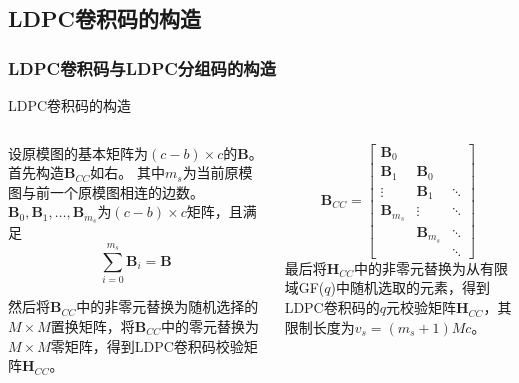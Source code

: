 \documentclass{beamer}
\begin{document}
\subsection{LDPC卷积码的构造}
\begin{frame}
	\frametitle{LDPC卷积码与LDPC分组码的构造}
		\begin{block}{LDPC卷积码的构造}
		\begin{columns}
		\begin{column}{0.5\textwidth}
		\footnotesize
设原模图的基本矩阵为$(c-b)\times c$的$\mathbf{B}$。
首先构造$\mathbf{B}_{CC}$如右。
其中$m_s$为当前原模图与前一个原模图相连的边数。$\mathbf{B}_0 , \mathbf{B}_1 , \dots , \mathbf{B}_{m_s}$为$(c-b)\times c$矩阵，且满足
\begin{equation*}
\sum^{m_s}_{i=0} \mathbf{B}_i = \mathbf{B}
\end{equation*}

然后将$\mathbf{B}_{CC}$中的非零元替换为随机选择的$M \times M$置换矩阵，将$\mathbf{B}_{CC}$中的零元替换为$M \times M$零矩阵，得到LDPC卷积码校验矩阵$\mathbf{H}_{CC}$。
\end{column}
\begin{column}{0.5\textwidth}
\footnotesize
\begin{equation*}
    \mathbf{B}_{CC} = \left[
          \begin{array}{ccc}
            \mathbf{B}_0& & \\
            \mathbf{B}_1 & \mathbf{B}_0 & \\
            \vdots & \mathbf{B}_1 & \ddots \\
            \mathbf{B}_{m_s} & \vdots & \ddots \\
             & \mathbf{B}_{m_s} & \ddots \\
             & & \ddots 
          \end{array} \right]
\end{equation*}
最后将$\mathbf{H}_{CC}$中的非零元替换为从有限域GF($q$)中随机选取的元素，得到LDPC卷积码的$q$元校验矩阵$\mathbf{H}_{CC}$，其限制长度为$v_s=(m_s+1)Mc$。
\end{column}
\end{columns}
		\end{block}
\end{frame}
\end{document}
